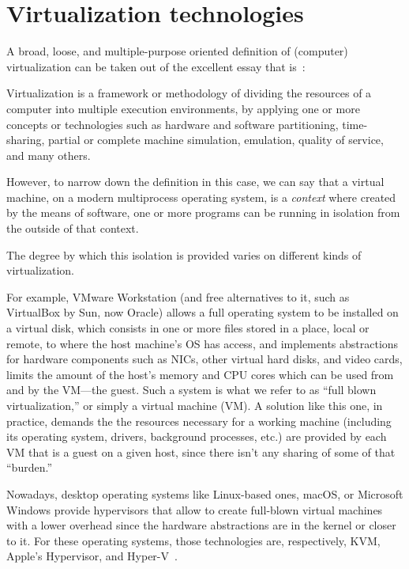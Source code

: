 \section{Virtualization technologies}
\label{sec:leavingvirtualization}

A broad, loose, and multiple-purpose oriented definition of (computer) virtualization can be taken out of the excellent essay that is~\cite{introvirtualization}:
\begin{displayquote}
Virtualization is a framework or methodology of dividing the resources of a computer into multiple execution environments, by applying one or more concepts or technologies such as hardware and software partitioning, time-sharing, partial or complete machine simulation, emulation, quality of service, and many others.
\end{displayquote}

However, to narrow down the definition in this case, we can say that a virtual machine, on a modern multiprocess operating system, is a \emph{context} where created by the means of software, one or more programs can be running in isolation from the outside of that context.

The degree by which this isolation is provided varies on different kinds of virtualization.

For example, VMware Workstation (and free alternatives to it, such as VirtualBox by Sun, now Oracle) allows a full operating system to be installed on a virtual disk, which consists in one or more files stored in a place, local or remote, to where the host machine's OS has access, and implements abstractions for hardware components such as NICs, other virtual hard disks, and video cards, limits the amount of the host's memory and CPU cores which can be used from and by the VM---the guest. %
Such a system is what we refer to as ``full blown virtualization,'' or simply a virtual machine (VM).
A solution like this one, in practice, demands the the resources necessary for a working machine (including its operating system, drivers, background processes, etc.) are provided by each VM that is a guest on a given host, since there isn't any sharing of some of that ``burden.''

Nowadays, desktop operating systems like Linux-based ones, macOS, or Microsoft Windows provide hypervisors that allow to create full-blown virtual machines with a lower overhead since the hardware abstractions are in the kernel or closer to it.
For these operating systems, those technologies are, respectively, KVM, Apple's Hypervisor, and Hyper-V~\cite{whatiskvm,applehypervisor,hyperv}.

